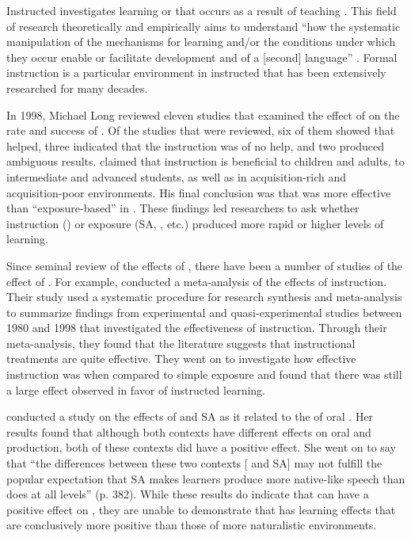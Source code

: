 \documentclass[output=paper]{langsci/langscibook}
\begin{document}
Instructed  investigates  learning or  that occurs as a result of teaching \citep[2716]{Loewen2013}. This field of research theoretically and empirically aims to understand “how the systematic manipulation of the mechanisms for learning and/or the conditions under which they occur enable or facilitate development and  of a [second] language” \citep[2]{Loewen2015}. Formal instruction is a particular environment in instructed  that has been extensively researched for many decades. 

In 1998, Michael Long reviewed eleven studies that examined the effect of  on the rate and success of  . Of the studies that were reviewed, six of them showed that  helped, three indicated that the instruction was of no help, and two produced ambiguous results. \citet{Long1983} claimed that instruction is beneficial to children and adults, to intermediate and advanced students, as well as in acquisition-rich and acquisition-poor environments. His final conclusion was that  was more effective than “exposure-based” in  . These findings led researchers to ask whether instruction () or exposure (SA, , etc.) produced more rapid or higher levels of learning. 

Since  seminal review of the effects of , there have been a number of studies of the effect of . For example, \citet{NorrisOrtega2001} conducted a meta-analysis of the effects of  instruction. Their study used a systematic procedure for research synthesis and meta-analysis to summarize findings from experimental and quasi-experimental studies between 1980 and 1998 that investigated the effectiveness of  instruction. Through their meta-analysis, they found that the literature suggests that instructional treatments are quite effective. They went on to investigate how effective instruction was when compared to simple exposure and found that there was still a large effect observed in favor of instructed learning.

\newpage 
\citet{Trenchs-Parera2009} conducted a study on the effects of  and SA as it related to the  of oral . Her results found that although both contexts have different effects on oral  and production, both of these contexts did have a positive effect. She went on to say that “the differences between these two contexts [ and SA] may not fulfill the popular expectation that SA makes learners produce more native-like speech than does  at all levels” (p. 382). While these results do indicate that  can have a positive effect on  , they are unable to demonstrate that  has learning effects that are conclusively more positive than those of more naturalistic environments.
\end{document}
